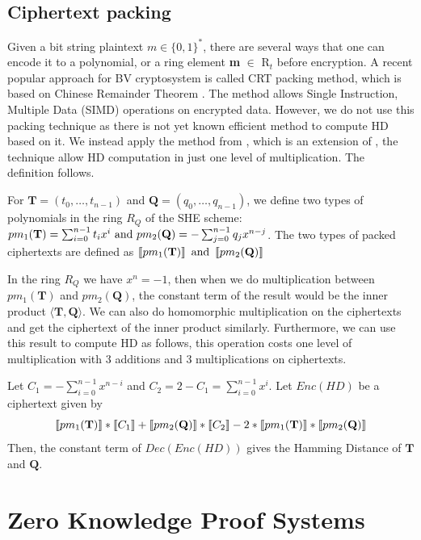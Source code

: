 \subsection{Ciphertext packing}
\label{sub:ciphertext_packing}
Given a bit string plaintext $m \in \{0,1\}^*$, there are several ways that one
can encode it to a polynomial, or a ring element \textbf{m} $\in$ R$_{t}$ before
encryption. A recent popular approach for BV cryptosystem is called CRT packing
method, which is based on Chinese Remainder Theorem \cite{smart2014fully}. The
method allows Single Instruction, Multiple Data (SIMD) operations on encrypted
data. However, we do not use this packing technique as there is not yet known
efficient method to compute HD based on it. We instead apply the method from
\cite{yasuda2014practical}, which is an extension of \cite{naehrig2011can},
the technique allow HD computation in just one level of multiplication. The
definition follows.
\begin{definition}
  For $\mathbf{T} = (t_0, \dots, t_{n-1})$ and
  $\mathbf{Q} = (q_0, \dots, q_{n-1})$, we define two types of polynomials in
  the ring $R_Q$ of the SHE scheme:
  $ pm_1(\mathbf{T}) = \sum_{i=0}^{n-1}t_ix^i \ \textnormal{and} \
  pm_2(\mathbf{Q}) = - \sum_{j=0}^{n-1}q_jx^{n-j} $.  The two types of packed
  ciphertexts are defined as
  $ \left\llbracket pm_{1}(\mathbf{T})\right\rrbracket \textnormal{ and } \left\llbracket pm_2(\mathbf{Q})\right\rrbracket $
\end{definition}
In the ring $R_Q$ we have $x^n = -1$, then when we do multiplication between
$pm_1(\mathbf{T})$ and $pm_2(\mathbf{Q})$, the constant term of the result would
be the inner product $\langle \mathbf{T}, \mathbf{Q}\rangle$. We can also do
homomorphic multiplication on the ciphertexts and get the ciphertext of the
inner product similarly. Furthermore, we can use this result to compute HD as
follows, this operation costs one level of multiplication with 3 additions and 3
multiplications on ciphertexts.

\begin{theorem}
  \label{theo:HDComputation}
  Let $C_1 = - \sum_{i=0}^{n-1}x^{n-i}$ and
  $C_2 = 2 - C_1 = \sum_{i=0}^{n-1}x^i$. Let $Enc(HD)$ be a ciphertext given by
  \[
    \left\llbracket pm_{1}(\mathbf{T})\right\rrbracket*\left\llbracket C_1 \right\rrbracket + \left\llbracket pm_{2}(\mathbf{Q})\right\rrbracket*
    \left\llbracket C_2 \right\rrbracket - 2*\left\llbracket pm_{1}(\mathbf{T})\right\rrbracket*\left\llbracket pm_{2}(\mathbf{Q})\right\rrbracket
  \]
  Then, the constant term of $Dec(Enc(HD))$ gives the Hamming Distance of
  $\mathbf{T}$ and $\mathbf{Q}$.
\end{theorem}
\section{Zero Knowledge Proof Systems}
\label{sec:defZKP}
